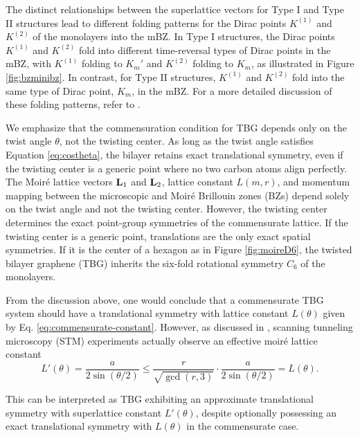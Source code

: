 The distinct relationships between the superlattice vectors for Type I and Type II structures lead to different folding patterns for the Dirac points \(K^{(1)}\) and \(K^{(2)}\) of the monolayers into the mBZ. In Type I structures, the Dirac points \(K^{(1)}\) and \(K^{(2)}\) fold into different time-reversal types of Dirac points in the mBZ, with \(K^{(1)}\) folding to \(K_m'\) and \(K^{(2)}\) folding to \(K_m\), as illustrated in Figure \ref{fig:bzminibz}. In contrast, for Type II structures, \(K^{(1)}\) and \(K^{(2)}\) fold into the same type of Dirac point, \(K_m\), in the mBZ. For a more detailed discussion of these folding patterns, refer to \cite{zou2018}.


We emphasize that the commensuration condition for TBG depends only on the twist angle $\theta$, not the twisting center. As long as the twist angle satisfies Equation \ref{eq:costheta}, the bilayer retains exact translational symmetry, even if the twisting center is a generic point where no two carbon atoms align perfectly. The Moiré lattice vectors $\vb{L}_1$ and $\vb{L}_2$, lattice constant \( L(m, r) \), and momentum mapping between the microscopic and Moiré Brillouin zones (BZs) depend solely on the twist angle and not the twisting center. However, the twisting center determines the exact point-group symmetries of the commensurate lattice. If the twisting center is a generic point, translations are the only exact spatial symmetries. If it is the center of a hexagon as in Figure \ref{fig:moireD6}, the twisted bilayer graphene (TBG) inherits the six-fold rotational symmetry \( C_6 \) of the monolayers.

From the discussion above, one would conclude that a commensurate TBG system should have a translational symmetry with lattice constant $L(\theta)$ given by Eq. \eqref{eq:commensurate-constant}. However, as discussed in \cite{zou2018}, scanning tunneling microscopy (STM) experiments actually observe an effective moiré lattice constant
\begin{equation} \label{eq:STM-constant}
L'(\theta) = \frac{a}{2 \sin(\theta/2)} \leq \frac{r}{\sqrt{\gcd(r,3)}} \cdot \frac{a}{2 \sin(\theta/2)} = L(\theta).
\end{equation}

This can be interpreted as TBG exhibiting an approximate translational symmetry with superlattice constant $L'(\theta)$, despite optionally possessing an exact translational symmetry with $L(\theta)$ in the commensurate case.

